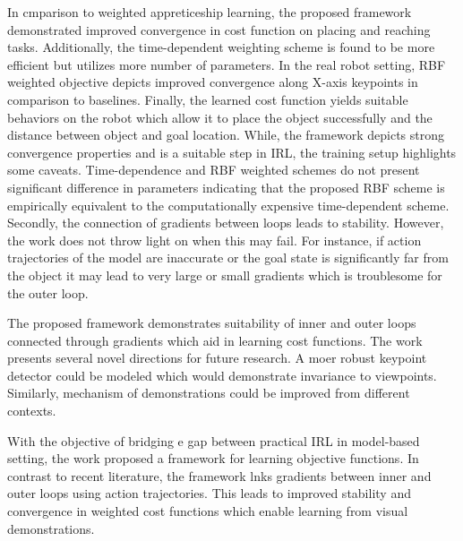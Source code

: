 \documentclass[11pt,letterpaper]{article}
\begin{document}
In cmparison to weighted appreticeship learning, the proposed framework demonstrated improved convergence in cost function on placing and reaching tasks. Additionally, the time-dependent weighting scheme is found to be more efficient but utilizes more number of parameters. In the real robot setting, RBF weighted objective depicts improved convergence along X-axis keypoints in comparison to baselines. Finally, the learned cost function yields suitable behaviors on the robot which allow it to place the object successfully and the distance between object and goal location. While, the framework depicts strong convergence properties and is a suitable step in IRL, the training setup highlights some caveats. Time-dependence and RBF weighted schemes do not present significant difference in parameters indicating that the proposed RBF scheme is empirically equivalent to the computationally expensive time-dependent scheme. Secondly, the connection of gradients between loops leads to stability. However, the work does not throw light on when this may fail. For instance, if action trajectories of the model are inaccurate or the goal state is significantly far from the object it may lead to very large or small gradients which is troublesome for the outer loop.

The proposed framework demonstrates suitability of inner and outer loops connected through gradients which aid in learning cost functions. The work presents several novel directions for future research. A moer robust keypoint detector could be modeled which would demonstrate invariance to viewpoints. Similarly, mechanism of demonstrations could be improved from different contexts. 

With the objective of bridging e gap between practical IRL in model-based setting, the work proposed a framework for learning objective functions. In contrast to recent literature, the framework lnks gradients between inner and outer loops using action trajectories. This leads to improved stability and convergence in weighted cost functions which enable learning from visual demonstrations. 
\end{document}
